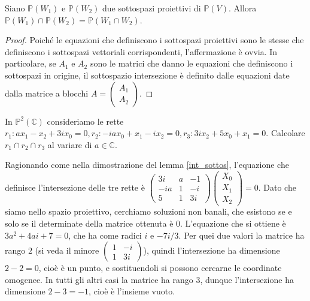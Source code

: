 \begin{lm} \label{int_sottos}
  Siano $\mathbb{P}(W_1)$ e $\mathbb{P}(W_2)$ due sottospazi proiettivi di $\mathbb{P}(V)$. Allora $\mathbb{P}(W_1) \cap \mathbb{P}(W_2)=\mathbb{P}(W_1 \cap W_2)$.
\end{lm}

\begin{proof}
  Poiché le equazioni che definiscono i sottospazi proiettivi sono le stesse che definiscono i sottospazi vettoriali corrispondenti, l'affermazione è ovvia. In particolare, se $A_1$ e $A_2$ sono le matrici che danno le equazioni che definiscono i sottospazi in origine, il sottospazio intersezione è definito dalle equazioni date dalla matrice a blocchi $A=\begin{pmatrix}
    A_1 \\ A_2
\end{pmatrix}$.
\end{proof}

\begin{exc}
  In $\mathbb{P}^2(\mathbb{C})$ consideriamo le rette $r_1: ax_1-x_2+3ix_0=0, r_2:-iax_0+x_1-ix_2=0, r_3: 3ix_2+5x_0+x_1=0$. Calcolare $r_1 \cap r_2 \cap r_3$ al variare di $a \in \mathbb{C}$.
\end{exc}

\begin{sol}
  Ragionando come nella dimostrazione del lemma \ref{int_sottos}, l'equazione che definisce l'intersezione delle tre rette è $\begin{pmatrix}
    3i & a & -1 \\ -ia & 1 & -i \\ 5 & 1 & 3i
\end{pmatrix}\begin{pmatrix}
  X_0 \\ X_1 \\ X_2
\end{pmatrix}=0$. Dato che siamo nello spazio proiettivo, cerchiamo soluzioni non banali, che esistono se e solo se il determinate della matrice ottenuta è $0$. L'equazione che si ottiene è $3a^2+4ai+7=0$, che ha come radici $i$ e $-7i/3$. Per quei due valori la matrice ha rango $2$ (si veda il minore $\begin{pmatrix}
  1 & -i \\ 1 & 3i
\end{pmatrix}$), quindi l'intersezione ha dimensione $2-2=0$, cioè è un punto, e sostituendoli si possono cercarne le coordinate omogenee. In tutti gli altri casi la matrice ha rango $3$, dunque l'intersezione ha dimensione $2-3=-1$, cioè è l'insieme vuoto.
\end{sol}

